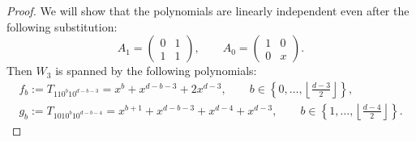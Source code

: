 \documentclass[10pt,a4paper]{amsart}
\numberwithin{equation}{section}
\begin{document}
\begin{proof}
We will show that the polynomials are linearly independent even after the following substitution:
\[
A_1=
\begin{pmatrix}
0 & 1 \\
1 & 1
\end{pmatrix}, \qquad
A_0=
\begin{pmatrix}
1 & 0 \\
0 & x
\end{pmatrix}.
\]
Then $W_3$ is spanned by the following polynomials:
\begin{gather*}
f_b := T_{110^b10^{d-b-3}}=x^{b}+x^{d-b-3} + 2x^{d-3}, \qquad b\in\left\{0,\dots,\left\lfloor \frac{d-3}{2}\right\rfloor\right\},\\
g_b := T_{1010^b10^{d-b-4}}=x^{b+1}+x^{d-b-3}+ x^{d-4} +x^{d-3},  \qquad b\in \left\{1,\dots,\left\lfloor \frac{d-4}{2}\right\rfloor\right\}.
\end{gather*}


\end{proof}
\end{document}
